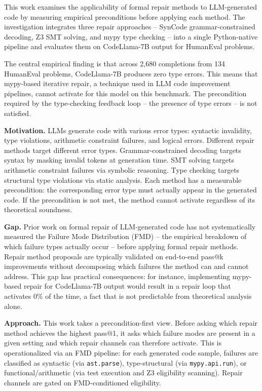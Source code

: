 
This work examines the applicability of formal repair methods to LLM-generated code by measuring empirical preconditions before applying each method. The investigation integrates three repair approaches -- SynCode grammar-constrained decoding, Z3 SMT solving, and mypy type checking -- into a single Python-native pipeline and evaluates them on CodeLlama-7B output for HumanEval problems.

The central empirical finding is that across 2,680 completions from 134 HumanEval problems, CodeLlama-7B produces zero type errors. This means that mypy-based iterative repair, a technique used in LLM code improvement pipelines, cannot activate for this model on this benchmark. The precondition required by the type-checking feedback loop -- the presence of type errors -- is not satisfied.

\textbf{Motivation.} LLMs generate code with various error types: syntactic invalidity, type violations, arithmetic constraint failures, and logical errors. Different repair methods target different error types. Grammar-constrained decoding targets syntax by masking invalid tokens at generation time. SMT solving targets arithmetic constraint failures via symbolic reasoning. Type checking targets structural type violations via static analysis. Each method has a measurable precondition: the corresponding error type must actually appear in the generated code. If the precondition is not met, the method cannot activate regardless of its theoretical soundness.

\textbf{Gap.} Prior work on formal repair of LLM-generated code has not systematically measured the Failure Mode Distribution (FMD) -- the empirical breakdown of which failure types actually occur -- before applying formal repair methods. Repair method proposals are typically validated on end-to-end pass@k improvements without decomposing which failures the method can and cannot address. This gap has practical consequences: for instance, implementing mypy-based repair for CodeLlama-7B output would result in a repair loop that activates 0\% of the time, a fact that is not predictable from theoretical analysis alone.

\textbf{Approach.} This work takes a precondition-first view. Before asking which repair method achieves the highest pass@1, it asks which failure modes are present in a given setting and which repair channels can therefore activate. This is operationalized via an FMD pipeline: for each generated code sample, failures are classified as syntactic (via \texttt{ast.parse}), type-structural (via \texttt{mypy.api.run}), or functional/arithmetic (via test execution and Z3 eligibility scanning). Repair channels are gated on FMD-conditioned eligibility.

